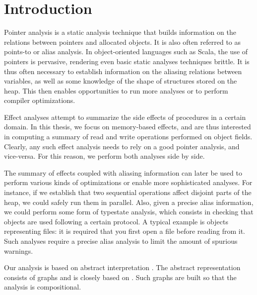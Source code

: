\chapter{Introduction} \label{chap:intro}
Pointer analysis is a static analysis technique that builds information on the
relations between pointers and allocated objects. It is also often referred to
as points-to or alias analysis.
In object-oriented languages such as Scala, the use of pointers is
pervasive, rendering even basic static analyses techniques brittle. It is
thus often necessary to establish information on the aliasing relations between
variables, as well as some knowledge of the shape of structures stored on the
heap. This then enables opportunities to run more analyses or to perform
compiler optimizations.

Effect analyses attempt to summarize the side effects of procedures in a certain
domain. In this thesis, we focus on memory-based effects, and are thus interested
in computing a summary of read and write operations performed on object fields.
Clearly, any such effect analysis needs to rely on a good pointer analysis,
and vice-versa. For this reason, we perform both analyses side by side.

The summary of effects coupled with aliasing information can later be used to
perform various kinds of optimizations or enable more sophisticated analyses.
For instance, if we establish that two sequential operations affect disjoint
parts of the heap, we could safely run them in parallel. Also, given a precise
alias information, we could perform some form of typestate analysis, which
consists in checking that objects are used following a certain protocol. A
typical example is objects representing files: it is required that you first
open a file before reading from it. Such
analyses\cite{DBLP:journals/tosem/FinkYDRG08} require a precise alias analysis
to limit the amount of spurious warnings.

Our analysis is based on abstract interpretation
\cite{DBLP:conf/popl/CousotC77,DBLP:conf/popl/CousotC02}. The abstract
representation consists of graphs and is closely based on \cite{Salcianu2006}.
Such graphs are built so that the analysis is compositional.

